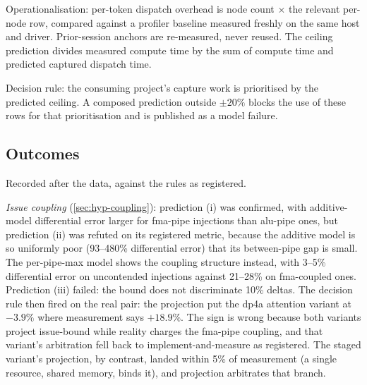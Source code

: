Operationalisation: per-token dispatch overhead is node count
\(\times\) the relevant per-node row, compared against a profiler baseline
measured freshly on the same host and driver. Prior-session anchors are
re-measured, never reused. The ceiling prediction divides measured compute
time by the sum of compute time and predicted captured dispatch time.

Decision rule: the consuming project's capture work is prioritised by the
predicted ceiling. A composed prediction outside \(\pm20\%\) blocks the
use of these rows for that prioritisation and is published as a model
failure.

\subsection{Outcomes}
\label{sec:hypotheses-outcomes}

Recorded after the data, against the rules as registered.

\emph{Issue coupling} (\cref{sec:hyp-coupling}): prediction (i) was
confirmed, with additive-model differential error larger for fma-pipe
injections than alu-pipe ones, but prediction (ii) was refuted on its
registered metric, because the additive model is so uniformly poor
(93--480\% differential error) that its between-pipe gap is small. The
per-pipe-max model shows the coupling structure instead, with 3--5\%
differential error on uncontended injections against 21--28\% on
fma-coupled ones. Prediction (iii) failed: the bound does not
discriminate 10\% deltas. The decision rule then fired on the real pair:
the projection put the dp4a attention variant at $-3.9\%$ where
measurement says $+18.9\%$. The sign is wrong because both variants
project issue-bound while reality charges the fma-pipe coupling, and
that variant's arbitration fell back to implement-and-measure as
registered. The staged variant's projection, by contrast, landed within
5\% of measurement (a single resource, shared memory, binds it), and
projection arbitrates that branch.

